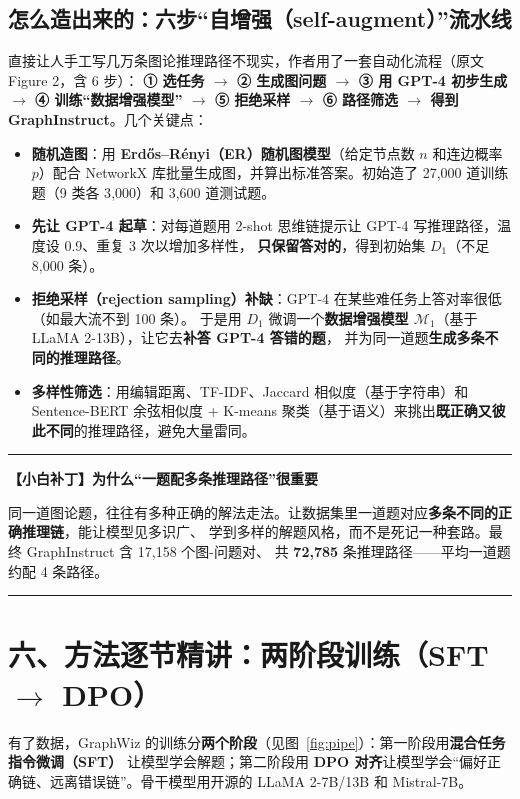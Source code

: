 \documentclass[11pt,UTF8,fontset=fandol]{ctexart}
\newenvironment{tip}[1]{%
  \par\smallskip\noindent\rule{\linewidth}{0.4pt}\par\nobreak
  \noindent\textbf{【小白补丁】#1}\par\nobreak\noindent\ignorespaces
}{%
  \par\noindent\rule{\linewidth}{0.4pt}\par\smallskip
}
\begin{document}
\subsection{怎么造出来的：六步“自增强（self-augment）”流水线}

直接让人手工写几万条图论推理路径不现实，作者用了一套自动化流程（原文 Figure 2，含 6 步）：
\textbf{① 选任务 $\to$ ② 生成图问题 $\to$ ③ 用 GPT-4 初步生成 $\to$ ④ 训练“数据增强模型” $\to$
⑤ 拒绝采样 $\to$ ⑥ 路径筛选 $\to$ 得到 GraphInstruct}。几个关键点：
\begin{itemize}[leftmargin=2em]
  \item \textbf{随机造图}：用 \textbf{Erd\H{o}s--R\'enyi（ER）随机图模型}（给定节点数 $n$ 和连边概率 $p$）配合
        NetworkX 库批量生成图，并算出标准答案。初始造了 27{,}000 道训练题（9 类各 3{,}000）和 3{,}600 道测试题。
  \item \textbf{先让 GPT-4 起草}：对每道题用 2-shot 思维链提示让 GPT-4 写推理路径，温度设 0.9、重复 3 次以增加多样性，
        \textbf{只保留答对的}，得到初始集 $D_1$（不足 8{,}000 条）。
  \item \textbf{拒绝采样（rejection sampling）补缺}：GPT-4 在某些难任务上答对率很低（如最大流不到 100 条）。
        于是用 $D_1$ 微调一个\textbf{数据增强模型 $\mathcal{M}_1$}（基于 LLaMA 2-13B），让它去\textbf{补答 GPT-4 答错的题}，
        并为同一道题\textbf{生成多条不同的推理路径}。
  \item \textbf{多样性筛选}：用编辑距离、TF-IDF、Jaccard 相似度（基于字符串）和 Sentence-BERT 余弦相似度 +
        K-means 聚类（基于语义）来挑出\textbf{既正确又彼此不同}的推理路径，避免大量雷同。
\end{itemize}

\begin{tip}{为什么“一题配多条推理路径”很重要}
同一道图论题，往往有多种正确的解法走法。让数据集里一道题对应\textbf{多条不同的正确推理链}，能让模型见多识广、
学到多样的解题风格，而不是死记一种套路。最终 GraphInstruct 含 17{,}158 个图-问题对、
共 \textbf{72{,}785} 条推理路径——平均一道题约配 4 条路径。
\end{tip}

\section{六、方法逐节精讲：两阶段训练（SFT $\to$ DPO）}

有了数据，GraphWiz 的训练分\textbf{两个阶段}（见图~\ref{fig:pipe}）：第一阶段用\textbf{混合任务指令微调（SFT）}
让模型学会解题；第二阶段用 \textbf{DPO 对齐}让模型学会“偏好正确链、远离错误链”。骨干模型用开源的
LLaMA 2-7B/13B 和 Mistral-7B。
\end{document}
